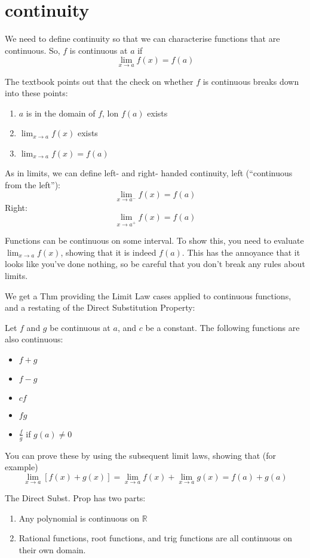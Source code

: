 \documentclass[10pt,a4paper]{report}
\begin{document}
\section{continuity}

We need to define continuity so that we can characterise functions that are continuous. So, $f$ is continuous at $a$ if
$$
	\lim_{x \to a} f(x) = f(a)
$$

The textbook points out that the check on whether $f$ is continuous breaks down into these points:

\begin{enumerate}
	\item $a$ is in the domain of $f$, lon $f(a)$ exists
	\item $\lim_{x \to a} f(x)$ exists
	\item $\lim_{x \to a} f(x) = f(a)$
\end{enumerate}

As in limits, we can define left- and right- handed continuity,
left (``continuous from the left''):
$$
	\lim_{x \to a^-} f(x) = f(a)
$$
Right:
$$
	\lim_{x \to a^+} f(x) = f(a)
$$

Functions can be continuous on some interval. To show this, you need to evaluate $\lim_{x \to a} f(x)$, showing that it is indeed $f(a)$. This has the annoyance that it looks like you've done nothing, so be careful that you don't break any rules about limits.

We get a Thm providing the Limit Law cases applied to continuous functions, and a restating of the Direct Substitution Property:

Let $f$ and $g$ be continuous at $a$, and $c$ be a constant. The following functions are also continuous:

\begin{itemize}
	\item $f + g$
	\item $f - g$
	\item $cf$
	\item $fg$
	\item $\frac{f}{g}$ if $g(a) \ne 0$
\end{itemize}

You can prove these by using the subsequent limit laws, showing that (for example) 
$$
\lim_{x \to a} [f(x) + g(x)] = \lim_{x \to a} f(x) + \lim_{x \to a} g(x) = f(a) + g(a)
$$

The Direct Subst. Prop has two parts:

\begin{enumerate}
	\item Any polynomial is continuous on $\mathbb{R}$
	\item Rational functions, root functions, and trig functions are all continuous on their own domain.
\end{enumerate}
\end{document}
